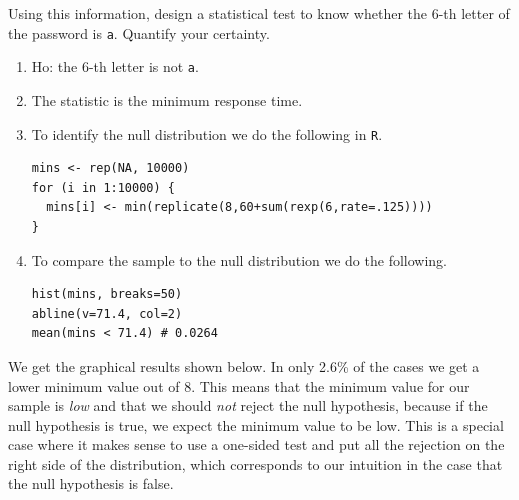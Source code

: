 \documentclass[12pt]{article}
\begin{document}
  \begin{Exercise}[label={exo9}]
  Using this information, design a statistical test to
  know whether the 6-th letter of the password is \texttt{a}.
  Quantify your certainty.
\end{Exercise}
\begin{Answer}[ref={exo9}]
  \begin{enumerate}
    \item Ho: the 6-th letter is not \texttt{a}.
    \item The statistic is the minimum response time.
    \item To identify the null distribution we do the following
      in \texttt{R}.

\begin{verbatim}
mins <- rep(NA, 10000)
for (i in 1:10000) {
  mins[i] <- min(replicate(8,60+sum(rexp(6,rate=.125))))
}
\end{verbatim}

    \item To compare the sample to the null distribution we do the
      following.

\begin{verbatim}
hist(mins, breaks=50)
abline(v=71.4, col=2)
mean(mins < 71.4) # 0.0264
\end{verbatim}

  \end{enumerate}

  We get the graphical results shown below. In only 2.6\% of
  the cases we get a lower minimum value out of 8. This means
  that the minimum value for our sample is \textit{low} and that
  we should \textit{not} reject the null hypothesis, because
  if the null hypothesis is true, we expect the minimum value
  to be low. This is a special case where it makes sense to
  use a one-sided test and put all the rejection on the right
  side of the distribution, which corresponds to our intuition
  in the case that the null hypothesis is false.


\end{Answer}
\end{document}
